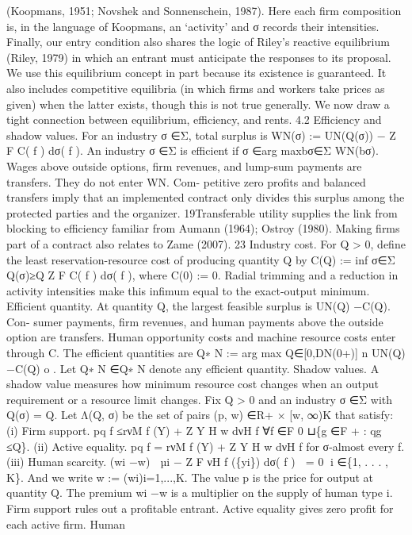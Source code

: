 (Koopmans, 1951; Novshek and Sonnenschein, 1987). Here each firm composition is,
in the language of Koopmans, an ‘activity’ and σ records their intensities. Finally, our
entry condition also shares the logic of Riley’s reactive equilibrium (Riley, 1979) in
which an entrant must anticipate the responses to its proposal.
We use this equilibrium concept in part because its existence is guaranteed. It also
includes competitive equilibria (in which firms and workers take prices as given) when
the latter exists, though this is not true generally. We now draw a tight connection
between equilibrium, efficiency, and rents.
4.2 Efficiency and shadow values. For an industry σ ∈Σ, total surplus is
WN(σ) := UN(Q(σ)) −
Z
F C( f ) dσ( f ).
An industry σ ∈Σ is efficient if σ ∈arg maxbσ∈Σ WN(bσ). Wages above outside options,
firm revenues, and lump-sum payments are transfers. They do not enter WN. Com-
petitive zero profits and balanced transfers imply that an implemented contract only
divides this surplus among the protected parties and the organizer.
19Transferable utility supplies the link from blocking to efficiency familiar from Aumann (1964);
Ostroy (1980). Making firms part of a contract also relates to Zame (2007).
23
Industry cost. For Q > 0, define the least reservation-resource cost of producing
quantity Q by
C(Q) :=
inf
σ∈Σ
Q(σ)≥Q
Z
F C( f ) dσ( f ),
where C(0) := 0. Radial trimming and a reduction in activity intensities make this
infimum equal to the exact-output minimum.
Efficient quantity. At quantity Q, the largest feasible surplus is UN(Q) −C(Q). Con-
sumer payments, firm revenues, and human payments above the outside option are
transfers. Human opportunity costs and machine resource costs enter through C.
The efficient quantities are
Q∗
N :=
arg max
Q∈[0,DN(0+)]
n
UN(Q) −C(Q)
o
.
Let Q∗
N ∈Q∗
N denote any efficient quantity.
Shadow values. A shadow value measures how minimum resource cost changes
when an output requirement or a resource limit changes. Fix Q > 0 and an industry
σ ∈Σ with Q(σ) = Q. Let Λ(Q, σ) be the set of pairs (p, w) ∈R+ × [w, ∞)K that
satisfy:
(i) Firm support.
pq f ≤rνM
f (Y) +
Z
Y H w dνH
f
∀f ∈F 0 ⊔\{g ∈F + : qg ≤Q\}.
(ii) Active equality.
pq f = rνM
f (Y) +
Z
Y H w dνH
f
for σ-almost every f.
(iii) Human scarcity.
(wi −w)

µi −
Z
F νH
f (\{yi\}) dσ( f )

= 0
∀i ∈\{1, . . . , K\}.
And we write w := (wi)i=1,...,K. The value p is the price for output at quantity Q. The
premium wi −w is a multiplier on the supply of human type i. Firm support rules
out a profitable entrant. Active equality gives zero profit for each active firm. Human
